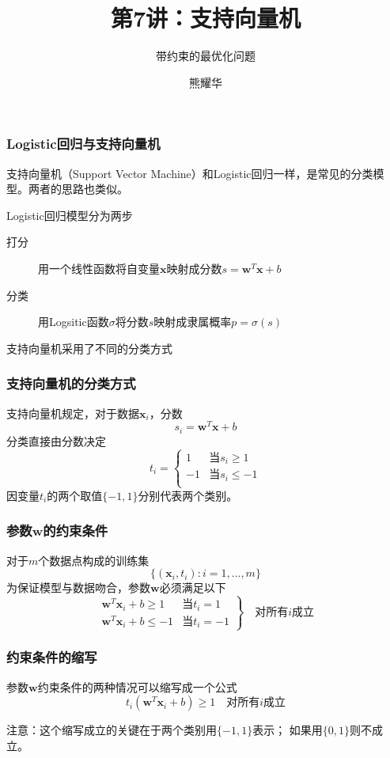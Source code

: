\documentclass[14pt]{beamer}
\title{第7讲：支持向量机}
\subtitle{带约束的最优化问题}
\author{熊耀华}
\institute{交通工程系}
\renewcommand{\vec}[1]{\bm{#1}}
\newcommand{\Vx}{\vec{x}}
\newcommand{\Vw}{\vec{w}}
\let\emph\relax %
\begin{document}
\begin{frame}
    \titlepage
\end{frame}

\begin{frame}
  \frametitle{Logistic回归与支持向量机}

  支持向量机（Support Vector Machine）和Logistic回归一样，是常见的分类模型。两者的思路也类似。

  Logistic回归模型分为两步
  \begin{description}
    \item[打分] 用一个线性函数将自变量$\Vx$映射成分数$s=\Vw^T\Vx+b$
    \item[分类] 用Logsitic函数$\sigma$将分数$s$映射成隶属概率$p=\sigma(s)$
  \end{description}

  支持向量机采用了不同的分类方式
\end{frame}

\begin{frame}
  \frametitle{支持向量机的分类方式}
  支持向量机规定，对于数据$\Vx_i$，分数
  \[s_i=\Vw^T\Vx+b\]
  分类直接由分数决定
  \[t_i=\left\{\begin{array}{rl}
    1 & \text{当}s_i\ge 1\\
    -1 & \text{当}s_i\le -1\\
  \end{array}\right.
  \]
  因变量$t_i$的两个取值$\{-1,1\}$分别代表两个类别。
\end{frame}

\begin{frame}
  \frametitle{参数$\Vw$的约束条件}
  对于$m$个数据点构成的训练集
  $$\{(\Vx_i,t_i):i=1,\ldots,m\}$$
  为保证模型与数据吻合，参数$\Vw$必须满足以下\emph{约束}
  \begin{equation}\left.
    \begin{array}{ll}
    \Vw^T\Vx_i+b\ge1 & \text{当}t_i=1\\
    \Vw^T\Vx_i+b\le-1 & \text{当}t_i=-1
    \end{array}\right\}\quad\text{对所有$i$成立}
  \end{equation}
\end{frame}

\begin{frame}
  \frametitle{约束条件的缩写}
  参数$\Vw$约束条件的两种情况可以缩写成一个公式
  \begin{equation}
    t_i(\Vw^T\Vx_i+b)\ge1\quad\text{对所有$i$成立}
  \end{equation}

  注意：这个缩写成立的关键在于两个类别用$\{-1,1\}$表示；
  如果用$\{0,1\}$则不成立。
\end{frame}
\end{document}
